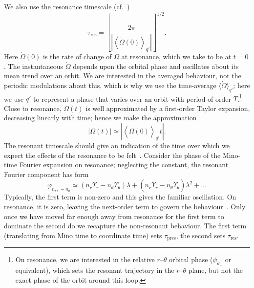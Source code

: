 \documentclass[aps,prd,amsfonts,amssymb,amsmath,nofootinbib,showpacs,superscriptaddress,twocolumn,floatfix]{revtex4-1}
\newcommand{\sub}[1]{\ensuremath{_\mathrm{#1}}}
\begin{document}
We also use the resonance timescale (cf.\ \cite{Ruangsri2014})
\begin{equation}
\tau\sub{res} = \left[\frac{2\pi}{\left|\left\langle\dot{\Omega}(0)\right\rangle_{q'}\right|}\right]^{1/2}.
\label{eq:t-res}
\end{equation}
Here $\dot{\Omega}(0)$ is the rate of change of $\Omega$ at resonance, which we take to be at $t = 0$. The instantaneous $\dot{\Omega}$ depends upon the orbital phase and oscillates about its mean trend over an orbit. We are interested in the averaged behaviour, not the periodic modulations about this, which is why we use the time-average $\langle\dot{\Omega}\rangle_{q'}$; here we use $q'$ to represent a phase that varies over an orbit with period of order $T$.\footnote{On resonance, we are interested in the relative $r$--$\theta$ orbital phase ($\psi_{\theta_-}$ or equivalent), which sets the resonant trajectory in the $r$--$\theta$ plane, but not the exact phase of the orbit around this loop.} Close to resonance, $\Omega(t)$ is well approximated by a first-order Taylor expansion, decreasing linearly with time; hence we make the approximation
\begin{equation}
\left|{\Omega(t)}\right| \simeq \left|\left\langle\dot{\Omega}(0)\right\rangle_{q'} t\right|.
\label{eq:Taylor-Omega}
\end{equation}
The resonant timescale should give an indication of the time over which we expect the effects of the resonance to be felt~\cite{Bosley1992}. Consider the phase of the Mino-time Fourier expansion on resonance; neglecting the constant, the resonant Fourier component has form
\begin{equation}
\varphi_{n_r,\,-n_\theta} \simeq \left(n_r\Upsilon_r - n_\theta\Upsilon_\theta\right)\lambda + \left(n_r\dot{\Upsilon}_r - n_\theta\dot{\Upsilon}_\theta\right)\lambda^2 + \ldots
\end{equation}
Typically, the first term is non-zero and this gives the familiar oscillation. On resonance, it is zero, leaving the next-order term to govern the behaviour~\cite{Flanagan2012,Ruangsri2014}. Only once we have moved far enough away from resonance for the first term to dominate the second do we recapture the non-resonant behaviour. The first term (translating from Mino time to coordinate time) sets $\tau\sub{pres}$, the second sets $\tau\sub{res}$.
\end{document}

